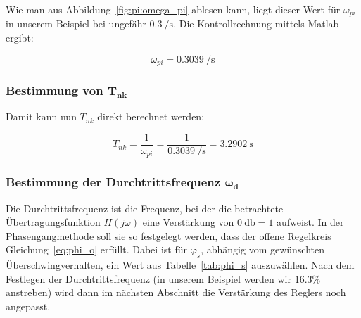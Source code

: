Wie    man   aus    Abbildung~\ref{fig:pi:omega_pi}   ablesen    kann,   liegt
dieser   Wert  f\"ur   $\omega_{pi}$  in   unserem  Beispiel   bei  ungef\"ahr
$\SI{0.3}{\per\second}$. Die Kontrollrechnung mittels Matlab ergibt:

\begin{equation} \label{eq:pi:omega_pi}
    \omega_{pi} = \SI{0.3039}{\per\second}
\end{equation}


\subsubsection{Bestimmung von $\mathbf{T_{nk}}$}
Damit kann nun $T_{nk}$ direkt berechnet werden\footnotemark[5]:

\begin{equation} \label{eq:pi:omega_pi}
    T_{nk} = \frac{1}{\omega_{pi}} = \frac{1}{\SI{0.3039}{\per\second}} = \SI{3.2902}{\second}
\end{equation}



\subsubsection{Bestimmung der Durchtrittsfrequenz $\mathbf{\boldsymbol{\omega}_d}$}

Die   Durchtrittsfrequenz  ist   die   Frequenz,  bei   der  die   betrachtete
\"Ubertragungsfunktion $H(j\omega)$ eine Verst\"arkung von $\SI{0}{\decibel} =
1$  aufweist. In der  Phasengangmethode soll  sie so  festgelegt werden,  dass
der  offene  Regelkreis  Gleichung~\ref{eq:phi_o} erf\"ullt. Dabei  ist  f\"ur
$\varphi_s$, abh\"angig vom gew\"unschten \"Uberschwingverhalten, ein Wert aus
Tabelle~\ref{tab:phi_s} auszuw\"ahlen\footnotemark[6].  Nach dem Festlegen der
Durchtrittsfrequenz (in  unserem Beispiel werden wir  $16.3\%$ anstreben) wird
dann im n\"achsten Abschnitt die Verst\"arkung des Reglers noch angepasst.

